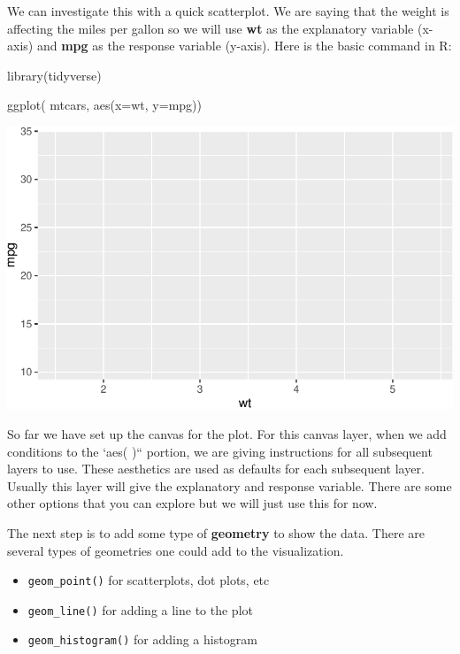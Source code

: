 \documentclass[
  letterpaper,
  DIV=11,
  numbers=noendperiod]{scrreprt}
\newenvironment{Shaded}{\begin{snugshade}}{\end{snugshade}}
\newcommand{\AttributeTok}[1]{\textcolor[rgb]{0.40,0.45,0.13}{#1}}
\newcommand{\FunctionTok}[1]{\textcolor[rgb]{0.28,0.35,0.67}{#1}}
\newcommand{\NormalTok}[1]{\textcolor[rgb]{0.00,0.23,0.31}{#1}}
\providecommand{\tightlist}{%
  \setlength{\itemsep}{0pt}\setlength{\parskip}{0pt}}\usepackage{longtable,booktabs,array}
\begin{document}
We can investigate this with a quick scatterplot. We are saying that the
weight is affecting the miles per gallon so we will use \textbf{wt} as
the explanatory variable (x-axis) and \textbf{mpg} as the response
variable (y-axis). Here is the basic command in R:

\begin{Shaded}
\begin{Highlighting}[]
\FunctionTok{library}\NormalTok{(tidyverse)}

\FunctionTok{ggplot}\NormalTok{( mtcars, }\FunctionTok{aes}\NormalTok{(}\AttributeTok{x=}\NormalTok{wt, }\AttributeTok{y=}\NormalTok{mpg))}
\end{Highlighting}
\end{Shaded}

\includegraphics{Advanced_Scatterplot_Techniques_files/figure-pdf/unnamed-chunk-2-1.pdf}

So far we have set up the canvas for the plot. For this canvas layer,
when we add conditions to the `aes( )`` portion, we are giving
instructions for all subsequent layers to use. These aesthetics are used
as defaults for each subsequent layer. Usually this layer will give the
explanatory and response variable. There are some other options that you
can explore but we will just use this for now.

The next step is to add some type of \textbf{geometry} to show the data.
There are several types of geometries one could add to the
visualization.

\begin{itemize}
\tightlist
\item
  \texttt{geom\_point()} for scatterplots, dot plots, etc
\item
  \texttt{geom\_line()} for adding a line to the plot
\item
  \texttt{geom\_histogram()} for adding a histogram
\end{itemize}
\end{document}
